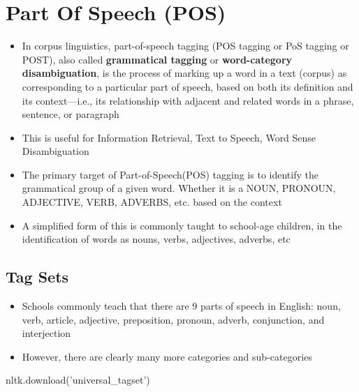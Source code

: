 \documentclass[
]{book}
\newenvironment{Shaded}{\begin{snugshade}}{\end{snugshade}}
\newcommand{\NormalTok}[1]{#1}
\newcommand{\StringTok}[1]{\textcolor[rgb]{0.5,0.5,0.5}{#1}}
\providecommand{\tightlist}{%
  \setlength{\itemsep}{0pt}\setlength{\parskip}{0pt}}
\begin{document}
\hypertarget{part-of-speech-pos}{%
\section{Part Of Speech (POS)}\label{part-of-speech-pos}}

\begin{itemize}
\tightlist
\item
  In corpus linguistics, part-of-speech tagging (POS tagging or PoS tagging or POST), also called \textbf{grammatical tagging} or \textbf{word-category disambiguation}, is the process of marking up a word in a text (corpus) as corresponding to a particular part of speech, based on both its definition and its context---i.e., its relationship with adjacent and related words in a phrase, sentence, or paragraph\\
\item
  This is useful for Information Retrieval, Text to Speech, Word Sense Disambiguation\\
\item
  The primary target of Part-of-Speech(POS) tagging is to identify the grammatical group of a given word. Whether it is a NOUN, PRONOUN, ADJECTIVE, VERB, ADVERBS, etc. based on the context\\
\item
  A simplified form of this is commonly taught to school-age children, in the identification of words as nouns, verbs, adjectives, adverbs, etc
\end{itemize}

\hypertarget{tag-sets}{%
\subsection{Tag Sets}\label{tag-sets}}

\begin{itemize}
\tightlist
\item
  Schools commonly teach that there are 9 parts of speech in English: noun, verb, article, adjective, preposition, pronoun, adverb, conjunction, and interjection\\
\item
  However, there are clearly many more categories and sub-categories
\end{itemize}

\begin{Shaded}
\begin{Highlighting}[]
\NormalTok{ nltk.download(}\StringTok{'universal_tagset'}\NormalTok{)}
\end{Highlighting}
\end{Shaded}
\end{document}
